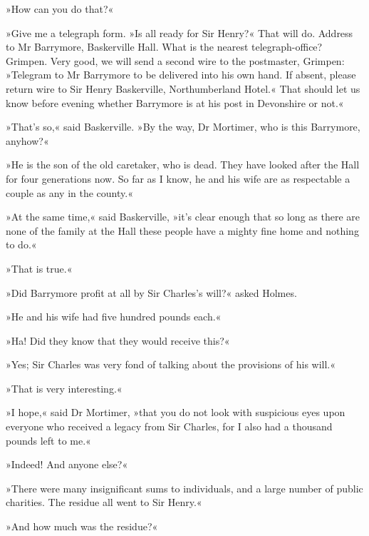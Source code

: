 »How can you do that?«

»Give me a telegraph form. »Is all ready for Sir Henry?« That will do. Address to Mr Barrymore, Baskerville Hall. What is the nearest telegraph-office? Grimpen. Very good, we will send a second wire to the postmaster, Grimpen: »Telegram to Mr Barrymore to be delivered into his own hand. If absent, please return wire to Sir Henry Baskerville, Northumberland Hotel.« That should let us know before evening whether Barrymore is at his post in Devonshire or not.«

»That's so,« said Baskerville. »By the way, Dr Mortimer, who is this Barrymore, anyhow?«

»He is the son of the old caretaker, who is dead. They have looked after the Hall for four generations now. So far as I know, he and his wife are as respectable a couple as any in the county.«

»At the same time,« said Baskerville, »it's clear enough that so long as there are none of the family at the Hall these people have a mighty fine home and nothing to do.«

»That is true.«

»Did Barrymore profit at all by Sir Charles's will?« asked Holmes.


»He and his wife had five hundred pounds each.«


»Ha! Did they know that they would receive this?«

»Yes; Sir Charles was very fond of talking about the provisions of his will.«

»That is very interesting.«


»I hope,« said Dr Mortimer, »that you do not look with suspicious eyes upon everyone who received a legacy from Sir Charles, for I also had a thousand pounds left to me.«

»Indeed! And anyone else?«

»There were many insignificant sums to individuals, and a large number of public charities. The residue all went to Sir Henry.«

»And how much was the residue?«


